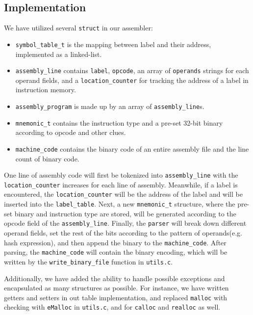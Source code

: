 \documentclass[11pt]{article}
\begin{document}

\subsection{Implementation}
\begin{flushleft}
We have utilized several \texttt{struct} in our assembler:
\begin{itemize}
\item \texttt{symbol\_table\_t} is the mapping between label and their address, implemented as a linked-list.
\item \texttt{assembly\_line} contains \texttt{label}, \texttt{opcode}, an array of \texttt{operands} strings for each operand fields, and a \texttt{location\_counter} for tracking the address of a label in instruction memory.
\item \texttt{assembly\_program} is made up by an array of \texttt{assembly\_line}s.
\item \texttt{mnemonic\_t} contains the instruction type and a pre-set 32-bit binary according to opcode and other clues.
\item \texttt{machine\_code} contains the binary code of an entire assembly file and the line count of binary code.
\end{itemize}
One line of assembly code will first be tokenized into \texttt{assembly\_line} with the \texttt{location\_counter} increases for each line of assembly. Meanwhile, if a label is encountered, the \texttt{location\_counter} will be the address of the label and will be inserted into the \texttt{label\_table}. Next, a new \texttt{mnemonic\_t} structure, where the pre-set binary and instruction type are stored, will be generated according to the opcode field of the \texttt{assembly\_line}. Finally, the \texttt{parser} will break down different operand fields, set the rest of the bits according to the pattern of operands(e.g. hash expression), and then append the binary to the \texttt{machine\_code}. After parsing, the \texttt{machine\_code} will contain the binary encoding, which will be written by the \texttt{write\_binary\_file} function in \texttt{utils.c}.
\end{flushleft}
\begin{flushleft}
Additionally, we have added the ability to handle possible exceptions and encapsulated as many structures as possible. For instance, we have written getters and setters in out table implementation, and replaced \texttt{malloc} with checking with \texttt{eMalloc} in \texttt{utils.c}, and for \texttt{calloc} and \texttt{realloc} as well.
\end{flushleft}
\end{document}
